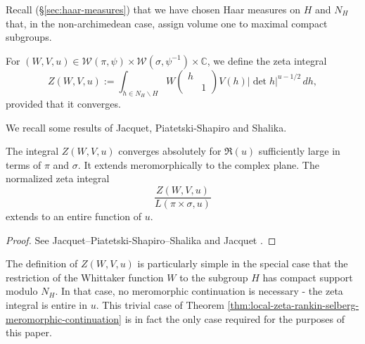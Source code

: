 Recall (\S\ref{sec:haar-measures}) that we have chosen Haar measures on $H$ and $N_H$ that, in the non-archimedean case, assign volume one to maximal compact subgroups.

For $(W,V,u) \in \mathcal{W}(\pi,\psi) \times \mathcal{W}(\sigma,\psi^{-1}) \times \mathbb{C}$, we define the zeta integral
\[
  Z(W, V, u) := \int_{h \in N_H \backslash H} W
  \begin{pmatrix}
    h &  \\
      & 1
  \end{pmatrix}
  V(h) |\det h|^{u-1/2} \, d h,
\]
provided that it converges. 

We recall some results of Jacquet, Piatetski-Shapiro and Shalika.
\begin{theorem}\label{thm:local-zeta-rankin-selberg-meromorphic-continuation}
  The integral $Z(W,V,u)$ converges absolutely for $\Re(u)$ sufficiently large in terms of $\pi$ and $\sigma$.  It extends meromorphically to the complex plane.  The normalized zeta integral
  \[
    \frac{Z(W,V,u)}{L(\pi \times \sigma, u)}
  \]
  extends to an entire function of $u$.
\end{theorem}
\begin{proof}
  See  Jacquet--Piatetski-Shapiro--Shalika \cite[\S2.7]{MR701565} and Jacquet \cite[\S5, \S8.1]{MR2533003}.
\end{proof}
The definition of $Z(W,V,u)$ is particularly simple in the special case that the restriction of the Whittaker function $W$ to the subgroup $H$ has compact support modulo $N_H$.  In that case, no meromorphic continuation is necessary - the zeta integral is entire in $u$.  This trivial case of Theorem \ref{thm:local-zeta-rankin-selberg-meromorphic-continuation} is in fact the only case required for the purposes of this paper.

